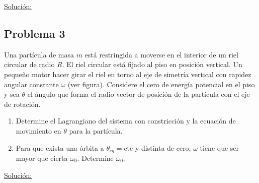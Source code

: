 \documentclass[a4paper,10pt]{article}
\numberwithin{equation}{section}
\begin{document}
\underline{Solución:} \vspace{.3cm}

\subsection{Problema 3}

Una partícula de masa $m$ está restringida a moverse en el interior de un riel circular 
de radio $R$. El riel circular está fijado al piso en posición vertical. Un pequeño 
motor hacer girar el riel en torno al eje de simetría vertical con rapidez angular 
constante $\omega$ (ver figura). Considere el cero de energía potencial en el piso y 
sea $\theta$ el ángulo que forma el radio vector de posición de la partícula con el 
eje de rotación.

\begin{enumerate}[label=\alph*)]
 \item Determine el Lagrangiano del sistema con constricción y la ecuación de movimiento 
 en $\theta$ para la partícula.
 \item Para que exista una órbita a $\theta_{eq}= \text{cte}$ y distinta de cero, $\omega$
 tiene que ser mayor que cierta $\omega_0$. Determine $\omega_0$.
\end{enumerate}

\vspace{.3cm}

\underline{Solución:} \vspace{.3cm}
\end{document}

